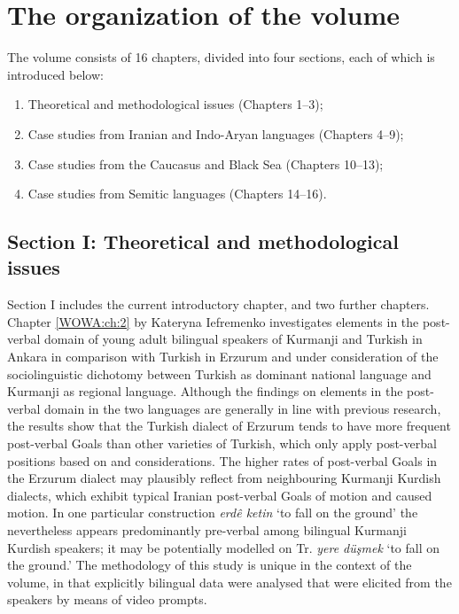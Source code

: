 \documentclass[output=paper,colorlinks,citecolor=brown,collectionchapter]{langscibook}
\begin{document}
\section{The organization of the volume}\label{Intro:ss:7}

The volume consists of 16 chapters, divided into four sections, each of which is introduced below: 

\begin{enumerate}[label=\Roman*]
    \item Theoretical and methodological issues (Chapters 1--3);
    \item Case studies from Iranian and Indo-Aryan languages (Chapters 4--9); 
    \item Case studies from the Caucasus and Black Sea (Chapters 10--13);
    \item Case studies from Semitic languages (Chapters 14--16).
\end{enumerate}

\subsection{Section I: Theoretical and methodological issues}\label{Intro:ss:7.1}

Section I includes the current introductory chapter, and two further chapters. Chapter \ref{WOWA:ch:2} by Kateryna Iefremenko investigates elements in the post-verbal domain of young adult bilingual speakers of Kurmanji and Turkish in Ankara in comparison with Turkish in Erzurum and under consideration of the sociolinguistic dichotomy between Turkish as dominant national language and Kurmanji as regional language. Although the findings on elements in the post-verbal domain in the two languages are generally in line with previous research, the results show that the Turkish dialect of Erzurum tends to have more frequent post-verbal Goals than other varieties of Turkish, which only apply post-verbal positions based on  and  considerations. The higher rates of post-verbal Goals in the Erzurum dialect may plausibly reflect  from neighbouring Kurmanji Kurdish dialects, which exhibit typical Iranian post-verbal Goals of motion and caused motion. In one particular construction  \textit{erdê ketin} `to fall on the ground' the  nevertheless appears predominantly pre-verbal among bilingual Kurmanji Kurdish speakers; it may be potentially modelled on Tr. \textit{yere düşmek} `to fall on the ground.' The methodology of this study is unique in the context of the volume, in that explicitly bilingual data were analysed that were elicited from the speakers by means of video prompts.
\end{document}
